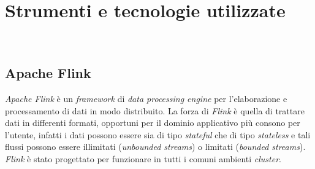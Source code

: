 
\chapter{Strumenti e tecnologie utilizzate}
\label{cap:strumenti-tecnologie}


\\

\section{Apache Flink}
\textit{Apache Flink} è un \textit{\textit{\gls{framework}}} di \textit{data processing engine} per l'elaborazione e processamento di dati in modo distribuito.
La forza di \textit{Flink} è quella di trattare dati in differenti formati, opportuni per il dominio applicativo più consono per l'utente, infatti i dati possono essere sia di tipo \textit{\gls{stateful}} che di tipo \textit{\gls{stateless}} e tali flussi possono essere illimitati (\textit{\gls{unbounded streams}}) o limitati (\textit{\gls{bounded streams}}). \textit{Flink} è stato progettato per funzionare in tutti i comuni ambienti \textit{\gls{cluster}}.

